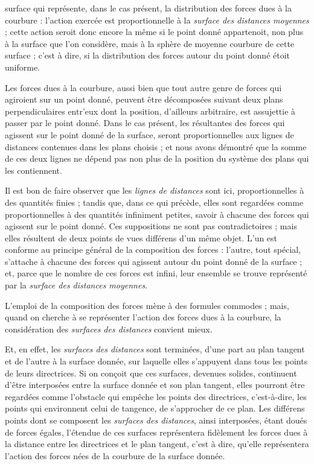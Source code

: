 \documentclass[11pt,a4paper]{article}
\begin{document}
surface qui représente, dans le cas présent, la distribution des
forces dues à la courbure : l'action exercée est proportionnelle à la
\emph{surface des distances moyennes} ; cette action seroit donc
encore la même si le point donné appartenoit, non plus à la surface
que l'on considère, mais à la sphère de moyenne courbure de cette
surface ; c'est à dire, si la distribution des forces autour du point
donné étoit uniforme.

Les forces dues à la courbure, aussi bien que tout autre genre de
forces qui agiroient sur un point donné, peuvent être décomposées
suivant deux plans perpendiculaires entr'eux dont la position,
d'ailleurs arbitraire, est assujettie à passer par le point donné.
Dans le cas présent, les résultantes des forces qui agissent sur le
point donné de la surface, seront proportionnelles aux lignes de
distances contenues dans les plans choisis ; et nous avons démontré
que la somme de ces deux lignes ne dépend pas non plus de la position
du système des plans qui les contiennent.

Il est bon de faire observer que les \emph{lignes de distances} sont
ici, proportionnelles à des quantités finies ; tandis que, dans ce qui
précède, elles sont regardées comme proportionnelles à des quantités
infiniment petites, savoir à chacune des forces qui agissent sur le
point donné. Ces suppositions ne sont pas contradictoires ; mais elles
résultent de deux points de vues différens d'un même objet. L'un est
conforme au principe général de la composition des forces : l'autre,
tout spécial, s'attache à chacune des forces qui agissent autour du
point donné de la surface ; et, parce que le nombre de ces forces est
infini, leur ensemble se trouve représenté par la \emph{surface des
distances moyennes}.

L'emploi de la composition des forces mène à des formules commodes ;
mais, quand on cherche à se représenter l'action des forces dues à la
courbure, la considération des \emph{surfaces des distances} convient
mieux.

Et, en effet, les \emph{surfaces des distances} sont terminées, d'une
part au plan tangent et de l'autre à la surface donnée, sur laquelle
elles s'appuyent dans tous les points de leurs directrices. Si on
conçoit que ces surfaces, devenues solides, continuent d'être
interposées entre la surface donnée et son plan tangent, elles
pourront être regardées comme l'obstacle qui empêche les points des
directrices, c'est-à-dire, les points qui environnent celui de
tangence, de s'approcher de ce plan. Les différens points dont se
composent les \emph{surfaces des distances}, ainsi interposées, étant
doués de forces égales, l'étendue de ces surfaces représentera
fidèlement les forces dues à la distance entre les directrices et le
plan tangent, c'est à dire, qu'elle représentera l'action des forces
nées de la courbure de la surface donnée.
\end{document}
